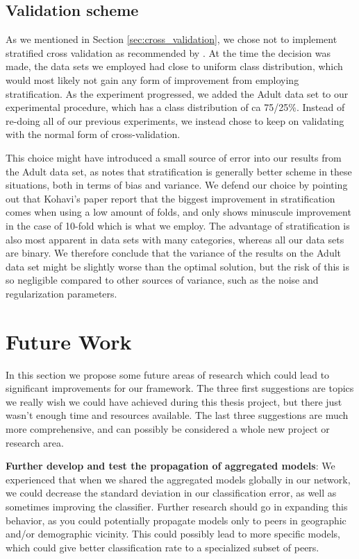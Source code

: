\subsection{Validation scheme}
As we mentioned in Section \ref{sec:cross_validation}, we chose not to implement stratified cross validation as recommended by \cite{kohavi1995crossvalidation}. At the time the decision was made, the data sets we employed had close to uniform class distribution, which would most likely not gain any form of improvement from employing stratification. As the experiment progressed, we added the Adult data set to our experimental procedure, which has a class distribution of ca 75/25\%. Instead of re-doing all of our previous experiments, we instead chose to keep on validating with the normal form of cross-validation. 

This choice might have introduced a small source of error into our results from the Adult data set, as \cite{kohavi1995crossvalidation} notes that stratification is generally better scheme in these situations, both in terms of bias and variance. We defend our choice by pointing out that Kohavi's paper report that the biggest improvement in stratification comes when using a low amount of folds, and only shows minuscule improvement in the case of 10-fold which is what we employ. The advantage of stratification is also most apparent in data sets with many categories, whereas all our data sets are binary. We therefore conclude that the variance of the results on the Adult data set might be slightly worse than the optimal solution, but the risk of this is so negligible compared to other sources of variance, such as the noise and regularization parameters.     

\section{Future Work} \label{sec:Future Work}
In this section we propose some future areas of research which could lead to significant improvements for our framework. The three first suggestions are topics we really wish we could have achieved during this thesis project, but there just wasn't enough time and resources available. The last three suggestions are much more comprehensive, and can possibly be considered a whole new project or research area.  

\vspace{2mm}
\noindent
\textbf{Further develop and test the propagation of aggregated models}: We experienced that when we shared the aggregated models globally in our network, we could decrease the standard deviation in our classification error, as well as sometimes improving the classifier. Further research should go in expanding this behavior, as you could potentially propagate models only to peers in geographic and/or demographic vicinity. This could possibly lead to more specific models, which could give better classification rate to a specialized subset of peers. 

